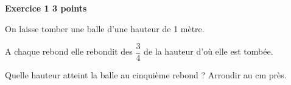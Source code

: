 \textbf{Exercice 1 \hfill 3 points}

\medskip

On laisse tomber une balle d'une hauteur de 1 mètre. 
 
A chaque rebond elle rebondit des $\dfrac{3}{4}$ de la hauteur d'où elle est tombée.
 
Quelle hauteur atteint la balle au cinquième rebond ? Arrondir au cm près. 

\bigskip

